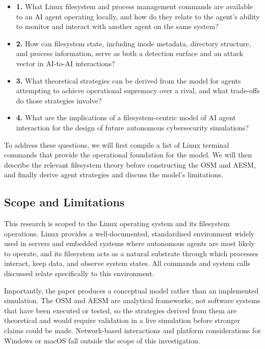 \begin{itemize}
    \item \textbf{1.} What Linux filesystem and process management commands are available to an AI agent operating locally, and how do they relate to the agent's ability to monitor and interact with another agent on the same system?
    \item \textbf{2.} How can filesystem state, including inode metadata, directory structure, and process information, serve as both a detection surface and an attack vector in AI-to-AI interactions?
    \item \textbf{3.} What theoretical strategies can be derived from the model for agents attempting to achieve operational supremacy over a rival, and what trade-offs do those strategies involve?
    \item \textbf{4.} What are the implications of a filesystem-centric model of AI agent interaction for the design of future autonomous cybersecurity simulations?
\end{itemize}

To address these questions, we will first compile a list of Linux terminal commands that provide the operational foundation for the model. We will then describe the relevant filesystem theory before constructing the OSM and AESM, and finally derive agent strategies and discuss the model's limitations.

\subsection{Scope and Limitations}
\label{ScopeAndLimitations}

This research is scoped to the Linux operating system and its filesystem operations. Linux provides a well-documented, standardised environment widely used in servers and embedded systems where autonomous agents are most likely to operate, and its filesystem acts as a natural substrate through which processes interact, keep data, and observe system states. All commands and system calls discussed relate specifically to this environment.

Importantly, the paper produces a conceptual model rather than an implemented simulation. The OSM and AESM are analytical frameworks, not software systems that have been executed or tested, so the strategies derived from them are theoretical and would require validation in a live simulation before stronger claims could be made. Network-based interactions and platform considerations for Windows or macOS fall outside the scope of this investigation.